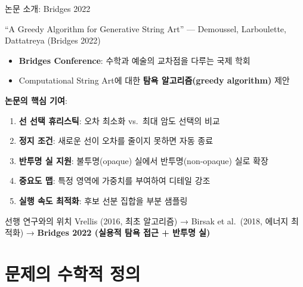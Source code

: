 \documentclass[10pt,aspectratio=169]{beamer}
\begin{document}
\begin{frame}{논문 소개: Bridges 2022}
  \begin{block}{``A Greedy Algorithm for Generative String Art''
    \normalfont — Demoussel, Larboulette, Dattatreya (Bridges 2022)}
    \begin{itemize}
      \item \textbf{Bridges Conference}: 수학과 예술의 교차점을 다루는 국제 학회
      \item Computational String Art에 대한 \textbf{탐욕 알고리즘(greedy algorithm)} 제안
    \end{itemize}
  \end{block}

  \vspace{0.2cm}
  \textbf{논문의 핵심 기여}:
  \begin{enumerate}
    \item \textbf{선 선택 휴리스틱}: 오차 최소화 vs.\ 최대 암도 선택의 비교
    \item \textbf{정지 조건}: 새로운 선이 오차를 줄이지 못하면 자동 종료
    \item \textbf{반투명 실 지원}: 불투명(opaque) 실에서 반투명(non-opaque) 실로 확장
    \item \textbf{중요도 맵}: 특정 영역에 가중치를 부여하여 디테일 강조
    \item \textbf{실행 속도 최적화}: 후보 선분 집합을 부분 샘플링
  \end{enumerate}

  \vspace{0.2cm}
  \begin{alertblock}{선행 연구와의 위치}
    Vrellis (2016, 최초 알고리즘) → Birsak et al.\ (2018, 에너지 최적화) →
    \textbf{Bridges 2022 (실용적 탐욕 접근 + 반투명 실)}
  \end{alertblock}
\end{frame}

\section{문제의 수학적 정의}
\end{document}

